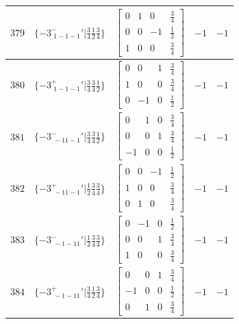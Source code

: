 \documentclass[fleqn,8pt]{jsarticle}
\begin{document}
\begin{longtable}{ccccc}
$ 379 $ & $ \{-3^{-}_{\,\,1-1-1}{}'|\frac{3}{4} \frac{1}{2} \frac{3}{4}\} $ & $ \begin{bmatrix} 0 & 1 & 0 & \frac{3}{4} \\ 0 & 0 & -1 & \frac{1}{2} \\ 1 & 0 & 0 & \frac{3}{4} \end{bmatrix} $ & $ -1 $ & $ -1 $ \\ \hline
$ 380 $ & $ \{-3^{+}_{\,\,1-1-1}{}'|\frac{3}{4} \frac{3}{4} \frac{1}{2}\} $ & $ \begin{bmatrix} 0 & 0 & 1 & \frac{3}{4} \\ 1 & 0 & 0 & \frac{3}{4} \\ 0 & -1 & 0 & \frac{1}{2} \end{bmatrix} $ & $ -1 $ & $ -1 $ \\ \hline
$ 381 $ & $ \{-3^{-}_{\,\,-11-1}{}'|\frac{3}{4} \frac{3}{4} \frac{1}{2}\} $ & $ \begin{bmatrix} 0 & 1 & 0 & \frac{3}{4} \\ 0 & 0 & 1 & \frac{3}{4} \\ -1 & 0 & 0 & \frac{1}{2} \end{bmatrix} $ & $ -1 $ & $ -1 $ \\ \hline
$ 382 $ & $ \{-3^{+}_{\,\,-11-1}{}'|\frac{1}{2} \frac{3}{4} \frac{3}{4}\} $ & $ \begin{bmatrix} 0 & 0 & -1 & \frac{1}{2} \\ 1 & 0 & 0 & \frac{3}{4} \\ 0 & 1 & 0 & \frac{3}{4} \end{bmatrix} $ & $ -1 $ & $ -1 $ \\ \hline
$ 383 $ & $ \{-3^{-}_{\,\,-1-11}{}'|\frac{1}{2} \frac{3}{4} \frac{3}{4}\} $ & $ \begin{bmatrix} 0 & -1 & 0 & \frac{1}{2} \\ 0 & 0 & 1 & \frac{3}{4} \\ 1 & 0 & 0 & \frac{3}{4} \end{bmatrix} $ & $ -1 $ & $ -1 $ \\ \hline
$ 384 $ & $ \{-3^{+}_{\,\,-1-11}{}'|\frac{3}{4} \frac{1}{2} \frac{3}{4}\} $ & $ \begin{bmatrix} 0 & 0 & 1 & \frac{3}{4} \\ -1 & 0 & 0 & \frac{1}{2} \\ 0 & 1 & 0 & \frac{3}{4} \end{bmatrix} $ & $ -1 $ & $ -1 $ \\
\end{longtable}
\end{document}
